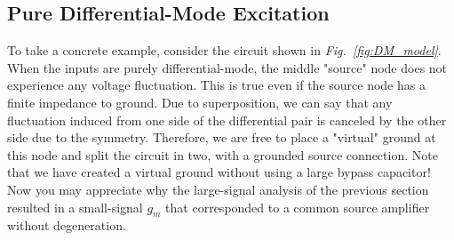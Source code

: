 \subsection{Pure Differential-Mode Excitation}
To take a concrete example, consider the circuit shown in \emph{Fig.~\ref{fig:DM_model}}. When the inputs are purely differential-mode, the middle "source" node does not experience any voltage fluctuation.  This is true even if the source node has a finite impedance to ground.  Due to superposition, we can say that any fluctuation induced from one side of the differential pair is canceled by the other side due to the symmetry. Therefore, we are free to place a "virtual" ground at this node and split the circuit in two, with a grounded source connection.  Note that we have created a virtual ground without using a large bypass capacitor!  Now you may appreciate why the large-signal analysis of the previous section resulted in a small-signal $g_m$ that corresponded to a common source amplifier without degeneration.
